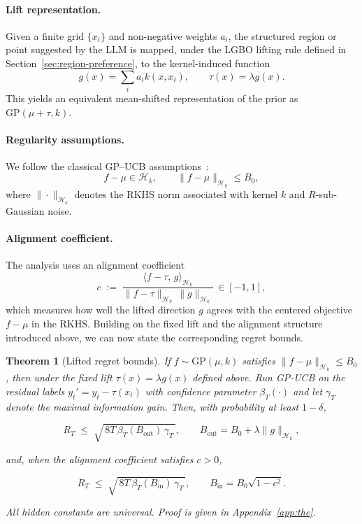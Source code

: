 \documentclass{article} %
\newtheorem{theorem}{Theorem}
\begin{document}
\paragraph{Lift representation.}
Given a finite grid $\{x_i\}$ and non-negative weights $a_i$, the structured region or point
suggested by the LLM is mapped, under the LGBO lifting rule defined in Section~\ref{sec:region-preference}, 
to the kernel-induced function
\[
g(x) = \sum_i a_i k(x,x_i), \qquad 
\tau(x) = \lambda g(x).
\]
This yields an equivalent mean-shifted representation of the prior as $\mathrm{GP}(\mu+\tau,k)$.
 


\paragraph{Regularity assumptions.}
We follow the classical GP--UCB assumptions~\citep{srinivas2009gaussian}:
\[
f-\mu\in\mathcal{H}_k,\qquad \|f-\mu\|_{\mathcal{H}_k}\le B_0,
\]
    where $\|\cdot\|_{\mathcal{H}_k}$ denotes the RKHS norm associated with kernel $k$ and $R$-sub-Gaussian noise.

\paragraph{Alignment coefficient.}
The analysis uses an alignment coefficient
\[
c \;:=\; 
\frac{\langle f-\tau,\, g\rangle_{\mathcal{H}_k}}
     {\|f-\tau\|_{\mathcal{H}_k}\,\|g\|_{\mathcal{H}_k}}
     \,\in [-1,1],
\]
which measures how well the lifted direction $g$ agrees with the centered 
objective $f-\mu$ in the RKHS. Building on the fixed lift and the alignment structure introduced above, we can now state the corresponding regret bounds.

\begin{theorem}[Lifted regret bounds]
\label{thm:concise}
If $f\!\sim\!\mathrm{GP}(\mu,k)$ satisfies $\|f-\mu\|_{\mathcal{H}_k}\!\le\! B_0$, then under the fixed 
lift $\tau(x)=\lambda g(x)$ defined above.  
Run GP-UCB on the residual labels $y_t'=y_t-\tau(x_t)$ with confidence parameter 
$\beta_T(\cdot)$ and let $\gamma_T$ denote the maximal information gain.  
Then, with probability at least $1-\delta$,

\[
R_T 
\;\le\;
\sqrt{\,8T\,\beta_T(B_{\mathrm{out}})\,\gamma_T\,},
\qquad
B_{\mathrm{out}}
  = B_0 + \lambda\|g\|_{\mathcal{H}_k},
\]

and, when the alignment coefficient satisfies $c>0$,

\[
R_T 
\;\le\;
\sqrt{\,8T\,\beta_T(B_{\mathrm{in}})\,\gamma_T\,},
\qquad
B_{\mathrm{in}}
  = B_0 \sqrt{1-c^{2}}.
\]

All hidden constants are universal.  
Proof is given in Appendix~\ref{app:the}.
\end{theorem}
\end{document}
